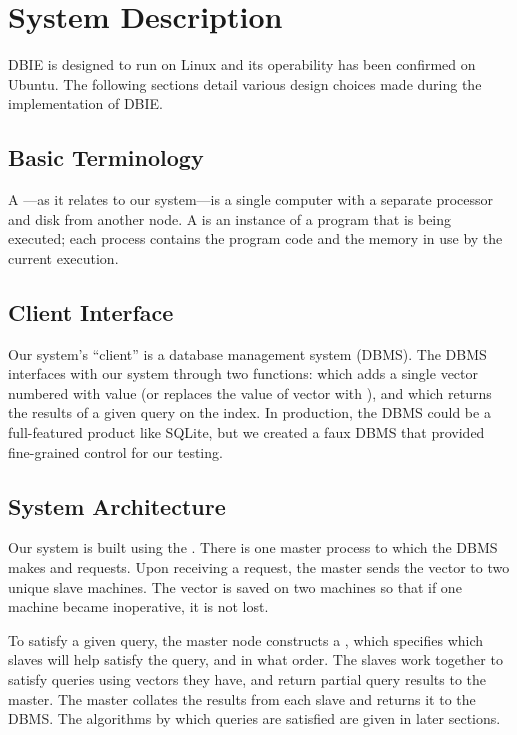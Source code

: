 \section{System Description}
DBIE is designed to run on Linux and its operability has been confirmed on
Ubuntu. The following sections detail various design choices made during the
implementation of DBIE.
%
\subsection{Basic Terminology}
A ---as it relates to our system---is a single computer with a separate
processor and disk from another node. A  is an instance of a program that is
being executed; each process contains the program code and the memory in use by
the current execution.

\subsection{Client Interface}
Our system's ``client'' is a database management system (DBMS). The DBMS
interfaces with our system through two functions:  which adds a single
vector numbered  with value  (or replaces the value of vector 
with ), and  which returns the
results of a given query  on the index. In production, the DBMS could be a
full-featured product like SQLite, but we created a faux DBMS that provided
fine-grained control for our testing.
%
\subsection{System Architecture}

Our system is built using the . There is one
master process to which the DBMS makes  and  requests.
Upon receiving a  request, the master sends the vector to
two unique slave machines. The vector is saved on two machines so that if
one machine became inoperative, it is not lost.
\par
To satisfy a given query, the master node constructs a ,
which specifies which slaves will help satisfy the query, and
in what order. The slaves work together to satisfy queries using vectors they
have, and return partial query results to the master. The master
collates the results from each slave and returns it to the DBMS.
The algorithms by which queries are satisfied are given in later sections.

